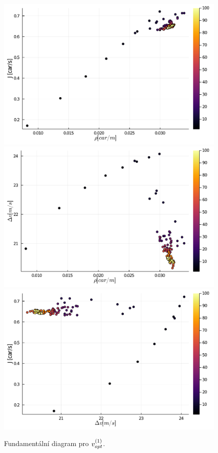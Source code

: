 \documentclass[a4paper, 12pt, fleqn]{article}
\begin{document}
\begin{figure}
	\centering
	\begin{minipage}[c]{0.7\textwidth}
		\centering
		\vspace*{\fill}
		\includegraphics[width=\textwidth]{images/FD_RJ_vopt1.pdf}
		\includegraphics[width=\textwidth]{images/FD_RV_vopt1.pdf}
		\includegraphics[width=\textwidth]{images/FD_VJ_vopt1.pdf}
	\end{minipage}
	\caption{Fundamentální diagram pro $v_{opt}^{(1)}$.}
\label{Obr: FD vopt1}
\end{figure}
\end{document}
